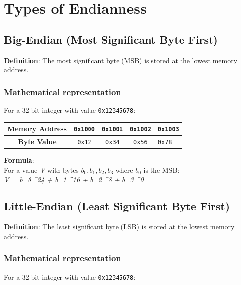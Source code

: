 \documentclass[11pt,a4paper]{article}
\newcommand{\hex}[1]{\texttt{0x#1}}
\newcommand{\byte}[1]{\texttt{#1}}
\newcommand{\address}[1]{\texttt{#1}}
\newcommand{\mathvar}[1]{\textit{#1}}
\begin{document}
\section{Types of Endianness}

\subsection{Big-Endian (Most Significant Byte First)}

\begin{definitionbox}
\textbf{Definition}: The most significant byte (MSB) is stored at the lowest memory address.
\end{definitionbox}

\subsubsection{Mathematical representation}
For a 32-bit integer with value \hex{12345678}:

\begin{center}
\begin{tabular}{|c|c|c|c|}
\hline
\textbf{Memory Address} & \address{0x1000} & \address{0x1001} & \address{0x1002} & \address{0x1003} \\
\hline
\textbf{Byte Value} & \byte{0x12} & \byte{0x34} & \byte{0x56} & \byte{0x78} \\
\hline
\end{tabular}
\end{center}

\begin{center}
\textbf{Formula}:\\
For a value \mathvar{V} with bytes \mathvar{$b_0, b_1, b_2, b_3$} where \mathvar{$b_0$} is the MSB:\\
\mathvar{V = b_0 ^{24} + b_1 \times 2^{16} + b_2 \times 2^8 + b_3 \times 2^0}
\end{center}

\subsection{Little-Endian (Least Significant Byte First)}

\begin{definitionbox}
\textbf{Definition}: The least significant byte (LSB) is stored at the lowest memory address.
\end{definitionbox}

\subsubsection{Mathematical representation}
For a 32-bit integer with value \hex{12345678}:
\end{document}
